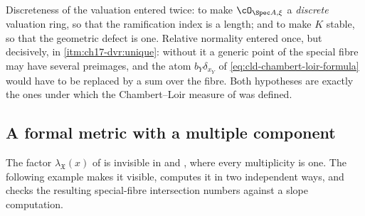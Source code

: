 \begin{remark}
\label{rem:ch17-dvr-hypotheses}
Discreteness of the valuation entered twice: to make
$\cO_{\Spec A,\xi}$ a \emph{discrete} valuation ring, so that the
ramification index is a length; and to make $K$ stable, so that the
geometric defect is one.  Relative normality entered once, but decisively,
in \cref{itm:ch17-dvr:unique}: without it a generic point of the special
fibre may have several preimages, and the atom $b_Y\delta_{x_Y}$ of
\eqref{eq:cld-chambert-loir-formula} would have to be replaced by a sum over
the fibre.  Both hypotheses are exactly the ones under which the
Chambert--Loir measure of  was defined.
\end{remark}

\subsection{A formal metric with a multiple component}
\label{sec:ch17-multiple-fibre}

The factor $\lambda_{\mathfrak X}(x)$ of  is
invisible in  and
, where every multiplicity is one.  The
following example makes it visible, computes it in two independent ways, and
checks the resulting special-fibre intersection numbers against a slope
computation.

